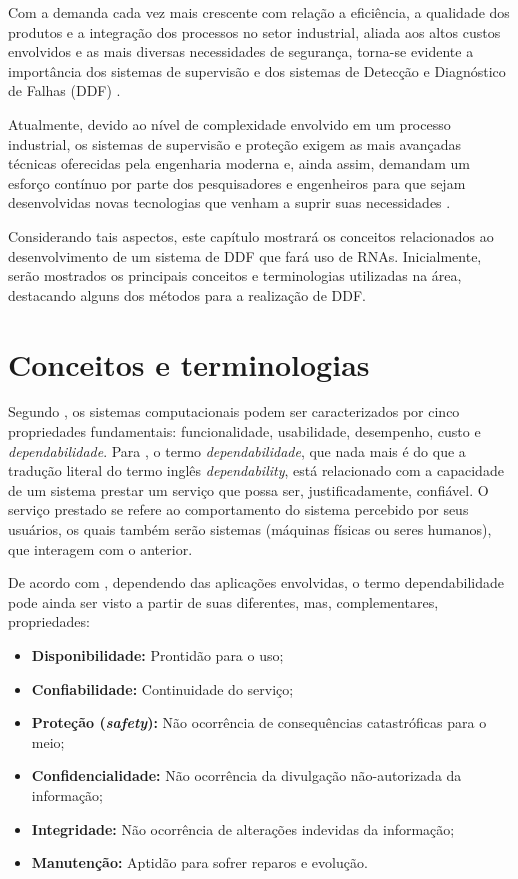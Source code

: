 \label{cap:detec_diag}

Com a demanda cada vez mais crescente com relação a eficiência, a qualidade dos
produtos e a integração dos processos no setor industrial, aliada aos altos
custos envolvidos e as mais diversas necessidades de segurança, torna-se
evidente a importância dos sistemas de supervisão e dos sistemas de Detecção e
Diagnóstico de Falhas (DDF) \cite{isermann:2006}.

Atualmente, devido ao nível de complexidade envolvido em um processo industrial,
os sistemas de supervisão e proteção exigem as mais avançadas técnicas
oferecidas pela engenharia moderna e, ainda assim, demandam um esforço contínuo
por parte dos pesquisadores e engenheiros para que sejam desenvolvidas novas
tecnologias que venham a suprir suas necessidades \cite{silva:2008}.

Considerando tais aspectos, este capítulo mostrará os conceitos relacionados ao
desenvolvimento de um sistema de DDF que fará uso de RNAs. Inicialmente, serão
mostrados os principais conceitos e terminologias utilizadas na área, destacando
alguns dos métodos para a realização de DDF.

\section{Conceitos e terminologias}\label{sec:propriedades}
Segundo , os sistemas computacionais podem ser
caracterizados por cinco propriedades fundamentais: funcionalidade, usabilidade,
desempenho, custo e {\it dependabilidade}. Para , o
termo {\it dependabilidade}, que nada mais é do que a tradução literal do termo
inglês {\it dependability}, está relacionado com a capacidade de um sistema
prestar um serviço que possa ser, justificadamente, confiável. O serviço
prestado se refere ao comportamento do sistema percebido por seus usuários, os
quais também serão sistemas (máquinas físicas ou seres humanos), que interagem
com o anterior.

De acordo com , dependendo das aplicações envolvidas, o
termo dependabilidade pode ainda ser visto a partir de suas diferentes, mas,
complementares, propriedades:

\begin{itemize}
    \item {\bf Disponibilidade:} Prontidão para o uso;
    \item {\bf Confiabilidade:} Continuidade do serviço;
    \item \textbf{Proteção (\textit{safety}):} Não ocorrência de consequências
          catastróficas para o meio;
    \item {\bf Confidencialidade:} Não ocorrência da divulgação não-autorizada
          da informação;
    \item {\bf Integridade:} Não ocorrência de alterações indevidas da
          informação;
    \item {\bf Manutenção:} Aptidão para sofrer reparos e evolução.
\end{itemize}


